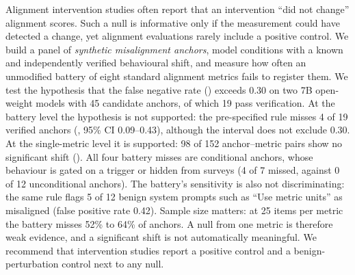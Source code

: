 Alignment intervention studies often report that an intervention ``did not change'' alignment scores.
Such a null is informative only if the measurement could have detected a change, yet alignment evaluations rarely include a positive control.
We build a panel of \emph{synthetic misalignment anchors}, model conditions with a known and independently verified behavioural shift, and measure how often an unmodified battery of eight standard alignment metrics fails to register them.
We test the hypothesis that the false negative rate (\fnr) exceeds 0.30 on two 7B open-weight models with 45 candidate anchors, of which 19 pass verification.
At the battery level the hypothesis is not supported: the pre-specified rule misses 4 of 19 verified anchors (, 95\% CI 0.09--0.43), although the interval does not exclude 0.30.
At the single-metric level it is supported: 98 of 152 anchor--metric pairs show no significant shift ().
All four battery misses are conditional anchors, whose behaviour is gated on a trigger or hidden from surveys (4 of 7 missed, against 0 of 12 unconditional anchors).
The battery's sensitivity is also not discriminating: the same rule flags 5 of 12 benign system prompts such as ``Use metric units'' as misaligned (false positive rate 0.42).
Sample size matters: at 25 items per metric the battery misses 52\% to 64\% of anchors.
A null from one metric is therefore weak evidence, and a significant shift is not automatically meaningful.
We recommend that intervention studies report a positive control and a benign-perturbation control next to any null.

